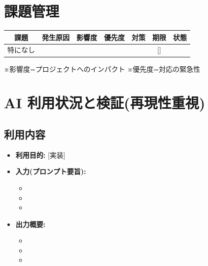 \documentclass[10pt]{ltjsarticle} %
\begin{document}
\vspace{5mm}

\section{課題管理}
\begin{table}[h]
    \centering
    \small
    \begin{tabularx}{\textwidth}{|c|>{\raggedright\arraybackslash}X|c|c|>{\raggedright\arraybackslash}X|c|c|}
    \hline
    \textbf{課題} & \textbf{発生原因} & \textbf{影響度} & \textbf{優先度} & \textbf{対策} & \textbf{期限} & \textbf{状態} \\ \hline
    特になし & [] &  &  & [] & [] &  \\ \hline
    \end{tabularx}
\end{table}
\noindent
\footnotesize{※影響度=プロジェクトへのインパクト \quad ※優先度=対応の緊急性}

\newpage

\section{AI 利用状況と検証(再現性重視)}

\subsection{利用内容}
\begin{itemize}
    \item \textbf{利用目的:} [実装]
    \item \textbf{入力(プロンプト要旨):}
    \begin{itemize}
        \item[$\circ$] [Arduinoのクライアントコードをテスト用に改良]
        \item[$\circ$] [Processing内での周波数計測・波形表示の実装]
        \item[$\circ$] [音確認テスト・正常発音数テストで得られた情報をまとめる．]
    \end{itemize}
    \item \textbf{出力概要:}
    \begin{itemize}
        \item[$\circ$] [示した要件通りに実装．正常に動作し，音が正しいか確認できた．]
        \item[$\circ$] [示した要件通りに実装．正常に動作し，送信した周波数と実際に鳴る周波数の関係が正しいことを確認できたとともに，音の波形表示も確認できた．]
        \item[$\circ$] [計測結果をわかりやすくまとめてもらった．]
    \end{itemize}
\end{itemize}
\end{document}
